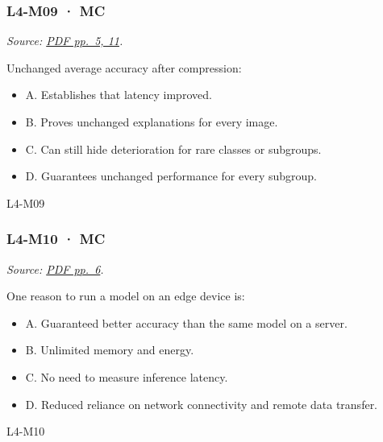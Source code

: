 \noindent\begin{minipage}{\linewidth}

\subsubsection{L4-M09 · MC}\label{l4-m09-mc}

\emph{Source:
\href{../Lab\%20Sessions/Lab4/manolo_presentation.pdf\#page=5}{PDF
pp.~5, 11}.}

Unchanged average accuracy after compression:

\begin{itemize}
\tightlist
\item
  A. Establishes that latency improved.
\item
  B. Proves unchanged explanations for every image.
\item
  C. Can still hide deterioration for rare classes or subgroups.
\item
  D. Guarantees unchanged performance for every subgroup.
\end{itemize}

\begin{solution}[8mm]{L4-M09}

\end{solution}
\end{minipage}\par\medskip

\noindent\begin{minipage}{\linewidth}

\subsubsection{L4-M10 · MC}\label{l4-m10-mc}

\emph{Source:
\href{../Lab\%20Sessions/Lab4/manolo_presentation.pdf\#page=6}{PDF
pp.~6}.}

One reason to run a model on an edge device is:

\begin{itemize}
\tightlist
\item
  A. Guaranteed better accuracy than the same model on a server.
\item
  B. Unlimited memory and energy.
\item
  C. No need to measure inference latency.
\item
  D. Reduced reliance on network connectivity and remote data transfer.
\end{itemize}

\begin{solution}[8mm]{L4-M10}

\end{solution}
\end{minipage}\par\medskip

